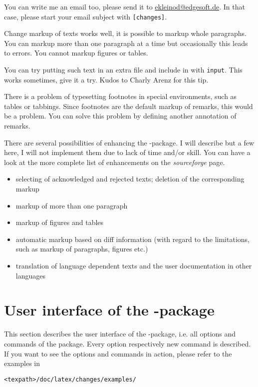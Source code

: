 You can write me an email too, please send it to \href{mailto:ekleinod@edgesoft.de}{ekleinod@edgesoft.de}.
In that case, please start your email subject with \texttt{[changes]}.

Change markup of texts works well, it is possible to markup whole paragraphs.
You can markup more than one paragraph at a time but occasionally this leads to errors.
You cannot markup figures or tables.

You can try putting such text in an extra file and include in with \texttt{input}.
This works sometimes, give it a try.
Kudos to Charly Arenz for this tip.

There is a problem of typesetting footnotes in special environments, such as tables or tabbings.
Since footnotes are the default markup of remarks, this would be a problem.
You can solve this problem by defining another annotation of remarks.

There are several possibilities of enhancing the -package.
I will describe but a few here, I will not implement them due to lack of time and/or skill.
You can have a look at the more complete list of enhancements on the \emph{sourceforge} page.

\begin{itemize}
	\item selecting of acknowledged and rejected texts; deletion of the corresponding markup
	\item markup of more than one paragraph
	\item markup of figures and tables
	\item automatic markup based on diff information (with regard to the limitations, such as markup of paragraphs, figures etc.)
	\item translation of language dependent texts and the user documentation in other languages
\end{itemize}


\section{User interface of the -package}
\label{sec:user}

This section describes the user interface of the -package, i.e. all options and commands of the package.
Every option respectively new command is described.
If you want to see the options and commands in action, please refer to the examples in

\texttt{<texpath>/doc/latex/changes/examples/}


